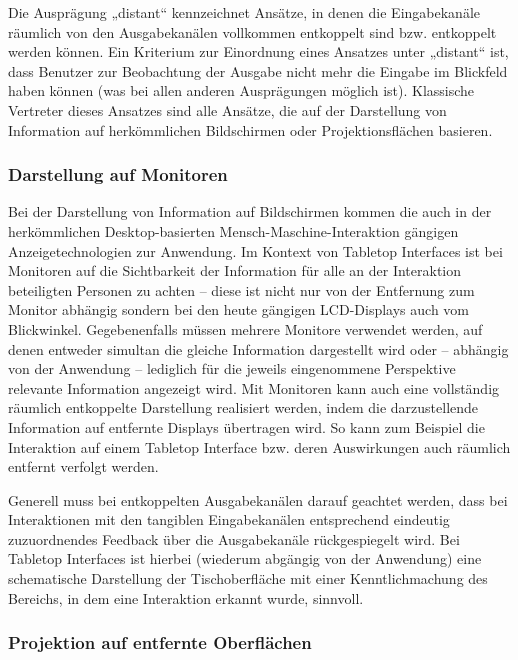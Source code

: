 Die Ausprägung „distant“ kennzeichnet Ansätze, in denen die Eingabekanäle räumlich von den Ausgabekanälen vollkommen entkoppelt sind bzw. entkoppelt werden können. Ein Kriterium zur Einordnung eines Ansatzes unter „distant“ ist, dass Benutzer zur Beobachtung der Ausgabe nicht mehr die Eingabe im Blickfeld haben können (was bei allen anderen Ausprägungen möglich ist). Klassische Vertreter dieses Ansatzes sind alle Ansätze, die auf der Darstellung von Information auf herkömmlichen Bildschirmen oder Projektionsflächen basieren.

\subsubsection{Darstellung auf Monitoren} %
\label{ssub:monitore}

Bei der Darstellung von Information auf Bildschirmen kommen die auch in der herkömmlichen Desktop-basierten Mensch-Maschine-Interaktion gängigen Anzeigetechnologien zur Anwendung. Im Kontext von Tabletop Interfaces ist bei Monitoren auf die Sichtbarkeit der Information für alle an der Interaktion beteiligten Personen zu achten -- diese ist nicht nur von der Entfernung zum Monitor abhängig sondern bei den heute gängigen \gls{LCD}-Displays auch vom Blickwinkel. Gegebenenfalls müssen mehrere Monitore verwendet werden, auf denen entweder simultan die gleiche  Information dargestellt wird oder -- abhängig von der Anwendung -- lediglich für die jeweils eingenommene Perspektive relevante Information angezeigt wird. Mit Monitoren kann auch eine vollständig räumlich entkoppelte Darstellung realisiert werden, indem die darzustellende Information auf entfernte Displays übertragen wird. So kann zum Beispiel die Interaktion auf einem Tabletop Interface bzw. deren Auswirkungen auch räumlich entfernt verfolgt werden.

Generell muss bei entkoppelten Ausgabekanälen darauf geachtet werden, dass bei Interaktionen mit den tangiblen Eingabekanälen entsprechend eindeutig zuzuordnendes Feedback über die Ausgabekanäle rückgespiegelt wird. Bei Tabletop Interfaces ist hierbei (wiederum abgängig von der Anwendung) eine schematische Darstellung der Tischoberfläche mit einer Kenntlichmachung des Bereichs, in dem eine Interaktion erkannt wurde, sinnvoll.


\subsubsection{Projektion auf entfernte Oberflächen} %
\label{ssub:projektion}

